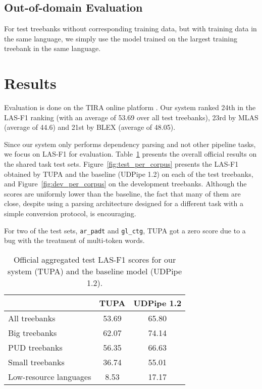 \documentclass[11pt,a4paper]{article}
\begin{document}
\subsection{Out-of-domain Evaluation}

For test treebanks without corresponding training data,
but with training data in the same language,
we simply use the model trained on the largest training treebank in the same language.


\section{Results}\label{sec:results}

Evaluation is done on the TIRA online platform \cite{tira}.
Our system ranked 24th in the LAS-F1 ranking
(with an average of 53.69 over all test treebanks),
23rd by MLAS (average of 44.6) and 21st by BLEX (average of 48.05).

Since our system only performs dependency parsing and not other pipeline tasks,
we focus on LAS-F1 \cite{nivre17udw} for evaluation.
Table~\ref{tab:overall_results} presents the overall
official results on the shared task test sets.
Figure~\ref{fig:test_per_corpus} presents the LAS-F1
obtained by TUPA and the baseline (UDPipe 1.2) on each
of the test treebanks,
and Figure~\ref{fig:dev_per_corpus} on the development treebanks.
Although the scores are uniformly lower than the baseline,
the fact that many of them are close, despite using a
parsing architecture designed for a different task
with a simple conversion protocol, is encouraging.

For two of the test sets, \verb|ar_padt| and \verb|gl_ctg|, TUPA got
a zero score due to a bug with the treatment of multi-token words.

\begin{table}
\begin{tabular}{lcc}
\hline
& \bf TUPA & \bf UDPipe 1.2 \\
\hline
All treebanks & 53.69 & 65.80 \\
Big treebanks & 62.07 & 74.14 \\
PUD treebanks & 56.35 & 66.63 \\
Small treebanks & 36.74 & 55.01 \\
Low-resource languages & 8.53 & 17.17
\end{tabular}
\caption{Official aggregated test LAS-F1 scores
for our system (TUPA) and the baseline model (UDPipe 1.2).
\label{tab:overall_results}}
\end{table}
\end{document}
